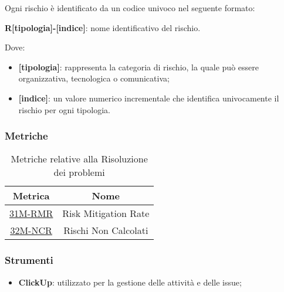 Ogni rischio è identificato da un codice univoco nel seguente formato:
\begin{center}
	\textbf{R[tipologia]-[indice]}: nome identificativo del rischio.
\end{center}
Dove:
\begin{itemize}
	\item \textbf{[tipologia]}: rappresenta la categoria di rischio, la quale può essere organizzativa, tecnologica o comunicativa;
	\item \textbf{[indice]}: un valore numerico incrementale che identifica univocamente il rischio per ogni tipologia.
\end{itemize}

\subsubsection{Metriche}
\begin{table}[h]
	\centering
	\begin{tabular}{|c|c|}
		\hline
		\textbf{Metrica} & \textbf{Nome}        						\\
		\hline
		\underline{\hyperlink{31M}{31M-RMR}}   &  Risk Mitigation Rate  \\
		\underline{\hyperlink{32M}{32M-NCR}}   &  Rischi Non Calcolati  \\
		\hline
	\end{tabular}
	\caption{Metriche relative alla Risoluzione dei problemi}
\end{table}

\subsubsection{Strumenti}
\begin{itemize}
	\item \textbf{ClickUp}: utilizzato per la gestione delle attività e delle issue;
\end{itemize}
